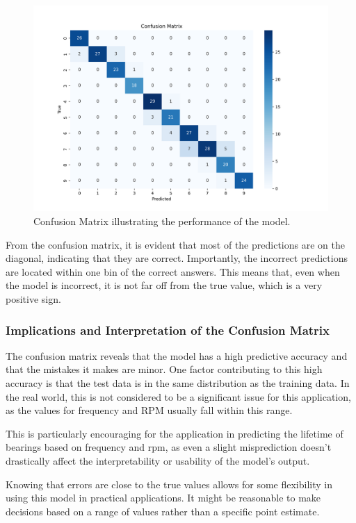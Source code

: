 \begin{figure}[h]
    \centering
    \includegraphics[width=0.8\linewidth]{assets/bearings-model/confusion-matrix.png}
    \caption{Confusion Matrix illustrating the performance of the model.}
    \label{fig:confusion_matrix}
\end{figure}

From the confusion matrix, it is evident that most of the predictions are on the diagonal, indicating that they are correct. Importantly, the incorrect predictions are located within one bin of the correct answers. This means that, even when the model is incorrect, it is not far off from the true value, which is a very positive sign. 

\subsubsection{Implications and Interpretation of the Confusion Matrix}

The confusion matrix reveals that the model has a high predictive accuracy and that the mistakes it makes are minor. One factor contributing to this high accuracy is that the test data is in the same distribution as the training data. In the real world, this is not considered to be a significant issue for this application, as the values for frequency and RPM usually fall within this range.

This is particularly encouraging for the application in predicting the lifetime of bearings based on frequency and \ac{rpm}, as even a slight misprediction doesn't drastically affect the interpretability or usability of the model's output. 

Knowing that errors are close to the true values allows for some flexibility in using this model in practical applications. It might be reasonable to make decisions based on a range of values rather than a specific point estimate. 

